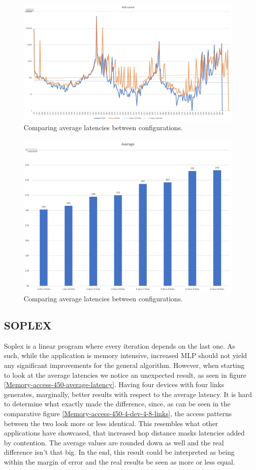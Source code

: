 \begin{figure}[!ht]
    \centering
    \includegraphics[width=0.75\linewidth]{figure/444-2_4-8.jpg}
    \caption{Comparing average latencies between configurations.}
    \label{Memory-access-444-links-compare}
\end{figure}
\begin{figure}[!ht]
    \centering
    \includegraphics[width=0.75\linewidth]{figure/444_averages.jpg}
    \caption{Comparing average latencies between configurations.}
    \label{Memory-access-444-average-latency}
\end{figure}

\subsection{SOPLEX}
Soplex is a linear program where every iteration depends on the last one. As such, while the application is memory intensive, increased MLP should not yield any significant improvements for the general algorithm. However, when starting to look at the average latencies we notice an unexpected result, as seen in figure \ref{Memory-access-450-average-latency}. Having four devices with four links generates, marginally, better results with respect to the average latency. It is hard to determine what exactly made the difference, since, as can be seen in the comparative figure \ref{Memory-access-450-4-dev-4-8-links}, the access patterns between the two look more or less identical. This resembles what other applications have showcased, that increased hop distance masks latencies added by contention. The average values are rounded down as well and the real difference isn't that big. In the end, this result could be interpreted as being within the margin of error and the real results be seen as more or less equal.

